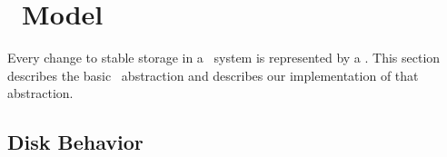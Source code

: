 
\section{\Patch\ Model}
\label{sec:patch}

\makeatletter
\let\emptyset\varnothing
\newcommand{\PBlock}[1]{\ensuremath{B_{#1}}}
\newcommand{\PSetlim}[1]{\def\@next{#1}\ifx\@next\@empty\else_{\@next}\fi}
\newcommand{\PMem}[1][]{\ensuremath{\mathpatchset{U}\PSetlim{#1}}}
\newcommand{\PInf}[1][]{\ensuremath{\mathpatchset{F}\PSetlim{#1}}}
\newcommand{\PDisk}[1][]{\ensuremath{\mathpatchset{C}\PSetlim{#1}}}
\newcommand{\PHard}[1][]{\ensuremath{\textit{\Nrb}\PSetlim{#1}}}
\newcommand{\PSoft}[1][]{\ensuremath{\textit{\Rb}\PSetlim{#1}}}
\newcommand{\PEmpty}[1][]{\ensuremath{\textit{\Noop}\PSetlim{#1}}}
\newcommand{\PDDepset}[1]{\ensuremath{\textit{dep}_1[#1]}}
\newcommand{\PDepend}{\ensuremath{\leadsto}}
\newcommand{\PDDepend}{\ensuremath{\rightarrow}}
\newcommand{\PDepset}[1]{\ensuremath{\textit{dep}[#1]}}
\newcommand{\PRDepset}[1]{\ensuremath{\textit{RDep}[#1]}}
\makeatother

Every change to stable storage in a \Kudos\ system is represented by a
\emph{\patch}.
%
This section describes the basic \patch\ abstraction
 and describes our implementation of that abstraction.

\begin{comment}
%
%
Each \patch\ $p$ encapsulates four important pieces of information: its
 \emph{block}, its \emph{state}, a set of \emph{direct dependencies}, and
 some \emph{undo data}.
\end{comment}

\subsection{Disk Behavior}

